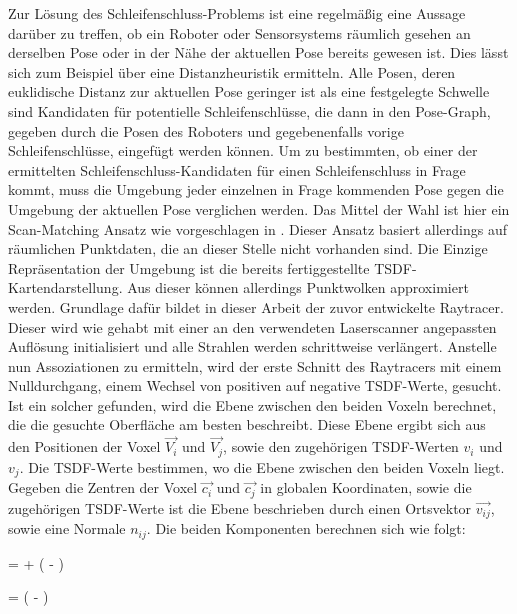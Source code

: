 Zur Lösung des Schleifenschluss-Problems ist eine regelmäßig eine Aussage darüber zu treffen, ob ein Roboter oder Sensorsystems räumlich gesehen an derselben Pose oder in der Nähe der aktuellen Pose bereits gewesen ist. Dies lässt sich zum Beispiel über eine Distanzheuristik ermitteln. Alle Posen, deren euklidische Distanz zur aktuellen Pose geringer ist als eine festgelegte Schwelle sind Kandidaten für potentielle Schleifenschlüsse, die dann in den Pose-Graph, gegeben durch die Posen des Roboters und gegebenenfalls vorige Schleifenschlüsse, eingefügt werden können. Um zu bestimmten, ob einer der ermittelten Schleifenschluss-Kandidaten für einen Schleifenschluss in Frage kommt, muss die Umgebung jeder einzelnen in Frage kommenden Pose gegen die Umgebung der aktuellen Pose verglichen werden. Das Mittel der Wahl ist hier ein Scan-Matching Ansatz wie vorgeschlagen in \cite{lu1997globally,shan2020lio,borrmann2008globally}. Dieser Ansatz basiert allerdings auf räumlichen Punktdaten, die an dieser Stelle nicht vorhanden sind. Die Einzige Repräsentation der Umgebung ist die bereits fertiggestellte TSDF-Kartendarstellung. Aus dieser können allerdings Punktwolken approximiert werden. Grundlage dafür bildet in dieser Arbeit der zuvor entwickelte Raytracer. Dieser wird wie gehabt mit einer an den verwendeten Laserscanner angepassten Auflösung initialisiert und alle Strahlen werden schrittweise verlängert. Anstelle nun Assoziationen zu ermitteln, wird der erste Schnitt des Raytracers mit einem Nulldurchgang, einem Wechsel von positiven auf negative TSDF-Werte, gesucht. Ist ein solcher gefunden, wird die Ebene zwischen den beiden Voxeln berechnet, die die gesuchte Oberfläche am besten beschreibt. Diese Ebene ergibt sich aus den Positionen der Voxel $\vec{V_i}$ und $\vec{V_j}$, sowie den zugehörigen TSDF-Werten $v_i$ und $v_j$. Die TSDF-Werte bestimmen, wo die Ebene zwischen den beiden Voxeln liegt. Gegeben die Zentren der Voxel $\vec{c_i}$ und $\vec{c_j}$ in globalen Koordinaten, sowie die zugehörigen TSDF-Werte ist die Ebene beschrieben durch einen Ortsvektor $\vec{v_{ij}}$, sowie eine Normale $n_{ij}$. Die beiden Komponenten berechnen sich wie folgt:

\begin{myequation}
 =  + \left( - \right) \cdot {}
\end{myequation}

\begin{myequation}
 = \left( - \right)
\end{myequation}

